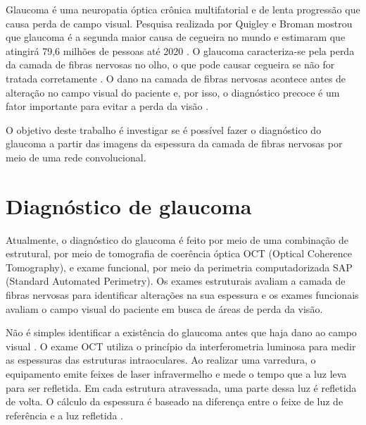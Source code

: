 \documentclass[conference]{IEEEtran}
\begin{document}
Glaucoma é uma neuropatia óptica crônica multifatorial e de lenta progressão que causa perda de campo visual. Pesquisa realizada por Quigley e Broman mostrou que glaucoma é a segunda maior causa de cegueira no mundo e estimaram que atingirá 79,6 milhões de pessoas até 2020 \cite{Quigley2006}. O glaucoma caracteriza-se pela perda da camada de fibras nervosas no olho, o que pode causar cegueira se não for tratada corretamente \cite{Quigley2011}. O dano na camada de fibras nervosas acontece antes de alteração no campo visual do paciente e, por isso, o diagnóstico precoce é um fator importante para evitar a perda da visão \cite{Malik2012}.

O objetivo deste trabalho é investigar se é possível fazer o diagnóstico do glaucoma a partir das imagens da espessura da camada de fibras nervosas por meio de uma rede convolucional.

\section{Diagnóstico de glaucoma}



Atualmente, o diagnóstico do glaucoma é feito por meio de uma combinação de estrutural, por meio de tomografia de coerência óptica OCT (Optical Coherence Tomography), e exame funcional, por meio da perimetria computadorizada SAP (Standard Automated Perimetry). Os exames estruturais avaliam a camada de fibras nervosas para identificar alterações na sua espessura e os exames funcionais avaliam o campo visual do paciente em busca de áreas de perda da visão. 

Não é simples identificar a existência do glaucoma antes que haja dano ao campo visual \cite{Populacoes2009}. O exame OCT utiliza o princípio da interferometria luminosa para medir as espessuras das estruturas intraoculares. Ao realizar uma varredura, o equipamento emite feixes de laser infravermelho e mede o tempo que a luz leva para ser refletida. Em cada estrutura atravessada, uma parte dessa luz é refletida de volta. O cálculo da espessura é baseado na diferença entre o feixe de luz de referência e a luz refletida \cite{huang1991}. 
\end{document}
